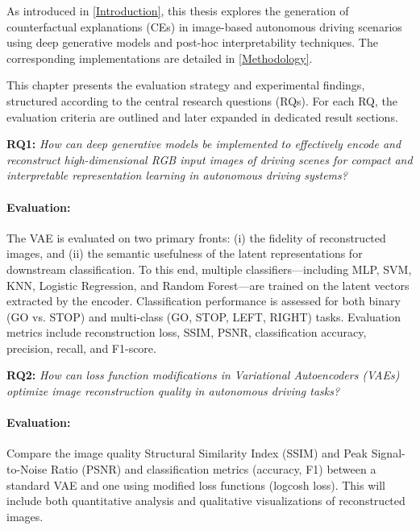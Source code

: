 As introduced in \cref{Introduction}, this thesis explores the generation of counterfactual explanations (CEs) in image-based autonomous driving scenarios using deep generative models and post-hoc interpretability techniques. The corresponding implementations are detailed in \cref{Methodology}.

This chapter presents the evaluation strategy and experimental findings, structured according to the central research questions (RQs). For each RQ, the evaluation criteria are outlined and later expanded in dedicated result sections.

\textbf{RQ1:} \textit{How can deep generative models be implemented to effectively encode and reconstruct high-dimensional RGB input images of driving scenes for compact and interpretable representation learning in autonomous driving systems?}

\vspace{-1em}

\paragraph{Evaluation:}The VAE is evaluated on two primary fronts: (i) the fidelity of reconstructed images, and (ii) the semantic usefulness of the latent representations for downstream classification. To this end, multiple classifiers—including MLP, SVM, KNN, Logistic Regression, and Random Forest—are trained on the latent vectors extracted by the encoder. Classification performance is assessed for both binary (GO vs. STOP) and multi-class (GO, STOP, LEFT, RIGHT) tasks. Evaluation metrics include reconstruction loss, SSIM, PSNR, classification accuracy, precision, recall, and F1-score.
    
\vspace{1em}

\textbf{RQ2:} \textit{How can loss function modifications in Variational Autoencoders (VAEs) optimize image reconstruction quality in autonomous driving tasks?} 

\vspace{-1em}

\paragraph{Evaluation:}Compare the image quality Structural Similarity Index (SSIM) and Peak Signal-to-Noise Ratio (PSNR) and classification metrics (accuracy, F1) between a standard VAE and one using modified loss functions (logcosh loss). This will include both quantitative analysis and qualitative visualizations of reconstructed images.

